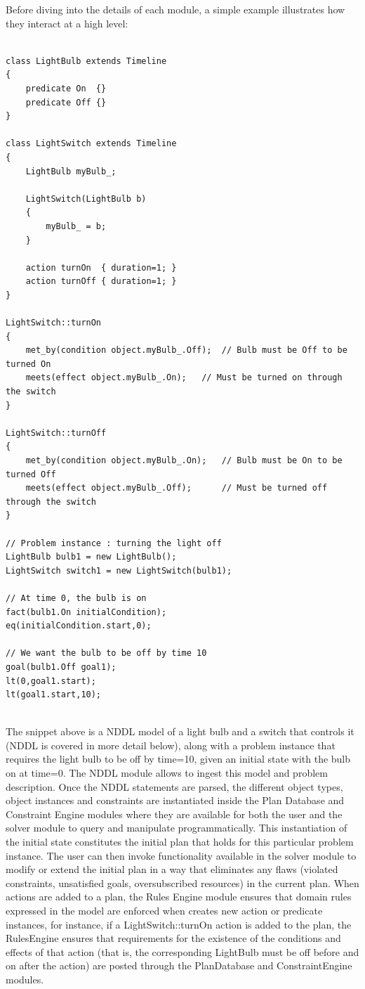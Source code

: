 Before diving into the details of each module, a simple example illustrates how they interact at a high level:

\begin{verbatim}

class LightBulb extends Timeline
{
    predicate On  {}
    predicate Off {}
}

class LightSwitch extends Timeline
{
    LightBulb myBulb_;

    LightSwitch(LightBulb b)
    {
        myBulb_ = b;
    }

    action turnOn  { duration=1; }
    action turnOff { duration=1; }
}

LightSwitch::turnOn
{
    met_by(condition object.myBulb_.Off);  // Bulb must be Off to be turned On
    meets(effect object.myBulb_.On);   // Must be turned on through the switch
}

LightSwitch::turnOff
{
    met_by(condition object.myBulb_.On);   // Bulb must be On to be turned Off
    meets(effect object.myBulb_.Off);      // Must be turned off through the switch
}

// Problem instance : turning the light off
LightBulb bulb1 = new LightBulb();
LightSwitch switch1 = new LightSwitch(bulb1);

// At time 0, the bulb is on
fact(bulb1.On initialCondition);
eq(initialCondition.start,0);

// We want the bulb to be off by time 10
goal(bulb1.Off goal1);
lt(0,goal1.start);
lt(goal1.start,10);


\end{verbatim}

The snippet above is a NDDL model of a light bulb and a switch that controls it (NDDL is covered in more detail below), along with a problem instance that requires the light bulb to be off by time=10, given an initial state with the bulb on at time=0. The NDDL module allows \eu to ingest this model and problem description. Once the NDDL statements are parsed, the different object types, object instances and constraints are instantiated inside the Plan Database and Constraint Engine modules where they are available for both the user and the solver module to query and manipulate programmatically. This instantiation of the initial state constitutes the initial plan that \eu holds for this particular problem instance. 
The user can then invoke functionality available in the solver module to modify or extend the initial plan in a way that eliminates any flaws (violated constraints, unsatisfied goals, oversubscribed resources) in the current plan. When actions are added to a plan, the Rules Engine module ensures that domain rules expressed in the model are enforced when \eu creates new action or predicate instances, for instance, if a LightSwitch::turnOn action is added to the plan, the RulesEngine  ensures that requirements for the existence of the conditions and effects of that action (that is, the corresponding LightBulb must be off before and on after the action) are posted through the PlanDatabase and ConstraintEngine modules.

